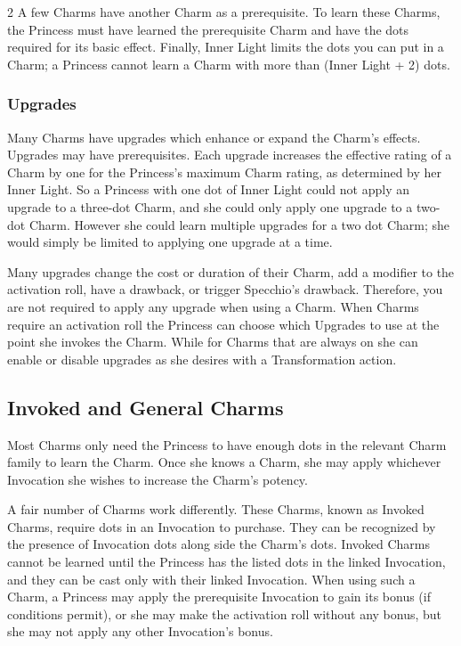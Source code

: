 \begin{multicols}{2}
A few Charms have another Charm as a prerequisite. To learn these Charms, the Princess must have learned the prerequisite Charm and have the dots required for its basic effect. Finally, Inner Light limits the dots you can put in a Charm; a Princess cannot learn a Charm with more than (Inner Light + 2) dots. 

\subsubsection*{Upgrades}

Many Charms have upgrades which enhance or expand the Charm's effects. Upgrades may have prerequisites. Each upgrade increases the effective rating of a Charm by one for the Princess's maximum Charm rating, as determined by her Inner Light. So a Princess with one dot of Inner Light could not apply an upgrade to a three-dot Charm, and she could only apply one upgrade to a two-dot Charm. However she could learn multiple upgrades for a two dot Charm; she would simply be limited to applying one upgrade at a time. 

Many upgrades change the cost or duration of their Charm, add a modifier to the activation roll, have a drawback, or trigger Specchio's drawback. Therefore, you are not required to apply any upgrade when using a Charm. When Charms require an activation roll the Princess can choose which Upgrades to use at the point she invokes the Charm. While for Charms that are always on she can enable or disable upgrades as she desires with a Transformation action.

\subsection*{Invoked and General Charms}

Most Charms only need the Princess to have enough dots in the relevant Charm family to learn the Charm. Once she knows a Charm, she may apply whichever Invocation she wishes to increase the Charm's potency. 

A fair number of Charms work differently. These Charms, known as Invoked Charms, require dots in an Invocation to purchase. They can be recognized by the presence of Invocation dots along side the Charm's dots. Invoked Charms cannot be learned until the Princess has the listed dots in the linked Invocation, and they can be cast only with their linked Invocation. When using such a Charm, a Princess may apply the prerequisite Invocation to gain its bonus (if conditions permit), or she may make the activation roll without any bonus, but she may not apply any other Invocation's bonus. 


\end{multicols}
